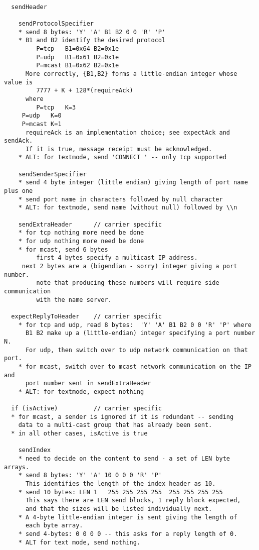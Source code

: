 \documentclass[a4]{article}
\begin{document}
\begin{verbatim}

  sendHeader

    sendProtocolSpecifier
    * send 8 bytes: 'Y' 'A' B1 B2 0 0 'R' 'P'
    * B1 and B2 identify the desired protocol
         P=tcp   B1=0x64 B2=0x1e
         P=udp   B1=0x61 B2=0x1e
         P=mcast B1=0x62 B2=0x1e
      More correctly, {B1,B2} forms a little-endian integer whose value is
         7777 + K + 128*(requireAck)
      where 
         P=tcp   K=3
	 P=udp   K=0
	 P=mcast K=1
      requireAck is an implementation choice; see expectAck and sendAck.
      If it is true, message receipt must be acknowledged.
    * ALT: for textmode, send 'CONNECT ' -- only tcp supported

    sendSenderSpecifier
    * send 4 byte integer (little endian) giving length of port name plus one
    * send port name in characters followed by null character
    * ALT: for textmode, send name (without null) followed by \\n

    sendExtraHeader      // carrier specific
    * for tcp nothing more need be done
    * for udp nothing more need be done
    * for mcast, send 6 bytes
         first 4 bytes specify a multicast IP address.
	 next 2 bytes are a (bigendian - sorry) integer giving a port number.
         note that producing these numbers will require side communication
         with the name server.

  expectReplyToHeader    // carrier specific
    * for tcp and udp, read 8 bytes:  'Y' 'A' B1 B2 0 0 'R' 'P' where
      B1 B2 make up a (little-endian) integer specifying a port number N.
      For udp, then switch over to udp network communication on that port.
    * for mcast, switch over to mcast network communication on the IP and
      port number sent in sendExtraHeader
    * ALT: for textmode, expect nothing

  if (isActive)          // carrier specific
  * for mcast, a sender is ignored if it is redundant -- sending
    data to a multi-cast group that has already been sent.
  * in all other cases, isActive is true

    sendIndex
    * need to decide on the content to send - a set of LEN byte arrays.
    * send 8 bytes: 'Y' 'A' 10 0 0 0 'R' 'P'
      This identifies the length of the index header as 10.
    * send 10 bytes: LEN 1   255 255 255 255  255 255 255 255
      This says there are LEN send blocks, 1 reply block expected,
      and that the sizes will be listed individually next.
    * A 4-byte little-endian integer is sent giving the length of
      each byte array.
    * send 4-bytes: 0 0 0 0 -- this asks for a reply length of 0.
    * ALT for text mode, send nothing.


\end{verbatim}
\end{document}
